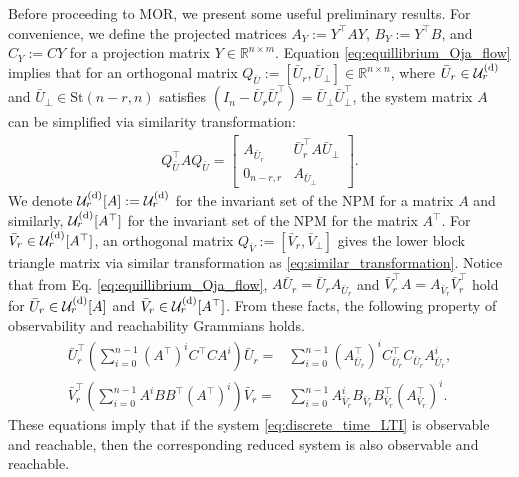 \documentclass{ifacconf}
\begin{document}
Before proceeding to MOR, we present some useful preliminary results. For convenience, we define the projected matrices $A_{Y} := Y^{\top}AY$, $B_{Y} := Y^{\top}B$, and $C_{Y} := CY$ for a projection matrix $Y \in \mathbb{R}^{n\times m}$.
Equation \eqref{eq:equillibrium_Oja_flow} implies that for an orthogonal matrix $Q_{\bar{U}}:= [\bar{U}_{r},\bar{U}_{\perp}] \in \mathbb{R}^{n\times n}$, where $\bar{U}_{r} \in \mathcal{U}_{r}^{\rm (d)}$ and $\bar{U}_{\perp} \in \mathrm{St}(n-r, n)$ satisfies $(I_{n} - \bar{U}_{r} \bar{U}_{r}^{\top}) = \bar{U}_{\perp} \bar{U}_{\perp}^{\top}$, the system matrix $A$ can be simplified via similarity transformation:
\begin{align}
    Q_{\bar{U}}^{\top} A Q_{\bar{U}} = \begin{bmatrix}
    A_{\bar{U}_{r}} & \bar{U}_{r}^{\top} A \bar{U}_{\perp}
    \\
    0_{n-r,r} & A_{\bar{U}_{\perp}}
    \end{bmatrix}.
    \label{eq:similar_transformation}
\end{align}
We denote $\mathcal{U}_{r}^{\rm (d)}[A] := \mathcal{U}_{r}^{\rm (d)}$ for the invariant set of the NPM for a matrix $A$ and similarly, $\mathcal{U}_{r}^{\rm (d)}[A^{\top}]$ for the invariant set of the NPM for the matrix $A^{\top}$.  For $\bar{V}_{r} \in \mathcal{U}_{r}^{\rm (d)}[A^{\top}]$, an orthogonal matrix $Q_{\bar{V}} := [\bar{V}_{r} , \bar{V}_{\perp}] $ gives the lower block triangle matrix via similar transformation as \eqref{eq:similar_transformation}. 
Notice that from Eq. \eqref{eq:equillibrium_Oja_flow}, $A \bar{U}_{r} = \bar{U}_{r} A_{\bar{U}_{r}}$ and $\bar{V}_{r}^{\top} A = A_{\bar{V}_{r}} \bar{V}_{r}^{\top}$ hold for $\bar{U}_{r} \in \mathcal{U}_{r}^{\rm (d)}[A]$ and $\bar{V}_{r} \in \mathcal{U}_{r}^{\rm (d)}[A^{\top}]$. 
From these facts, the following property of observability and reachability Grammians holds. 
\begin{align*}
    \bar{U}_{r}^{\top} \left( \sum _{i=0}^{n-1} (A^{\top}) ^{i} C^{\top}C A^{i} \right) \bar{U}_{r} 
    =& \sum _{i=0}^{n-1} (A_{\bar{U}_{r}}^{\top}) ^{i} C_{\bar{U}_{r}}^{\top}C_{\bar{U}_{r}} A_{\bar{U}_{r}}^{i} ,
    \\
    \bar{V}_{r}^{\top} \left( \sum _{i=0}^{n-1} A ^{i} BB^{\top} (A^{\top})^{i} \right) \bar{V} _{r}
    =& \sum _{i=0}^{n-1} A_{\bar{V}_{r}} ^{i} B_{\bar{V}_{r}}B_{\bar{V}_{r}}^{\top} (A_{\bar{V}_{r}}^{\top})^{i}.
\end{align*}
These equations imply that if the system \eqref{eq:discrete_time_LTI} is observable and reachable, then the corresponding reduced system is also observable and reachable. 
\end{document}
